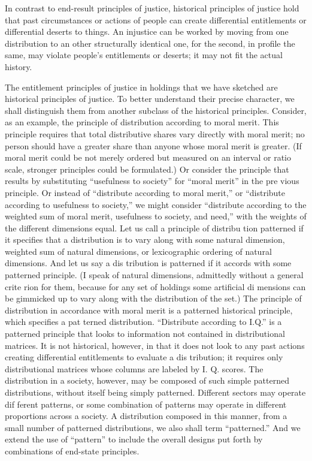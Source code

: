 \documentclass[11pt,openany]{book}
\begin{document}
In contrast to end-result principles of justice, historical principles of justice hold that past circumstances or actions of people can create differential entitlements or differential deserts to things. An injustice can be worked by moving from one distribution to an other structurally identical one, for the second, in profile the same, may violate people's entitlements or deserts; it may not fit the actual history. 

The entitlement principles of justice in holdings that we have sketched are historical principles of justice. To better understand their precise character, we shall distinguish them from another subclass of the historical principles. Consider, as an example, the principle of distribution according to moral merit. This principle requires that total distributive shares vary directly with moral merit; no person should have a greater share than anyone whose moral merit is greater. (If moral merit could be not merely ordered but measured on an interval or ratio scale, stronger principles could be formulated.) Or consider the principle that results by substituting ``usefulness to society'' for ``moral merit'' in the pre vious principle. Or instead of ``distribute according to moral merit,'' or ``distribute according to usefulness to society,'' we might consider ``distribute according to the weighted sum of moral merit, usefulness to society, and need,'' with the weights of the different dimensions equal. Let us call a principle of distribu tion patterned if it specifies that a distribution is to vary along with some natural dimension, weighted sum of natural dimensions, or lexicographic ordering of natural dimensions. And let us say a dis tribution is patterned if it accords with some patterned principle. (I speak of natural dimensions, admittedly without a general crite rion for them, because for any set of holdings some artificial di mensions can be gimmicked up to vary along with the distribution of the set.) The principle of distribution in accordance with moral merit is a patterned historical principle, which specifies a pat terned distribution. ``Distribute according to I.Q.'' is a patterned principle that looks to information not contained in distributional matrices. It is not historical, however, in that it does not look to any past actions creating differential entitlements to evaluate a dis tribution; it requires only distributional matrices whose columns are labeled by I. Q. scores. The distribution in a society, however, may be composed of such simple patterned distributions, without itself being simply patterned. Different sectors may operate dif ferent patterns, or some combination of patterns may operate in different proportions across a society. A distribution composed in this manner, from a small number of patterned distributions, we also shall term ``patterned.'' And we extend the use of ``pattern'' to include the overall designs put forth by combinations of end-state principles. 
\end{document}
